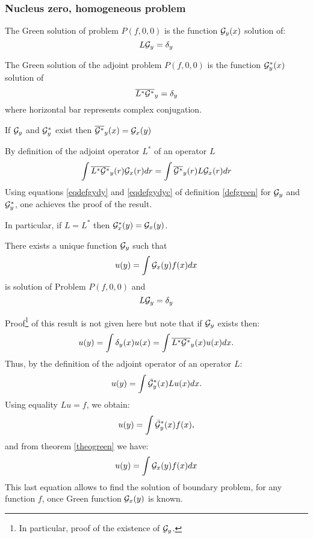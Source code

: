 \documentclass[12pt]{book}
\begin{document}
\subsubsection{Nucleus zero, homogeneous problem}
\begin{defn}\label{defgreen}
The Green solution of problem $P(f,0,0)$ is the
function 
${\cal G}_y(x)$ solution of: 
\begin{equation}\label{eqdefgydy}
L{\cal G}_y=\delta_y
\end{equation}

The Green solution of the adjoint problem $P(f,0,0)$ is the function
${\cal G}^*_y(x)$ solution of 
\begin{equation}\label{eqdefgydyc}
\overline{L^*{\cal G}^*}_y=\delta_y
\end{equation}
where horizontal bar represents complex conjugation.
\end{defn}
\begin{thm}\label{theogreen}
If ${\cal G}_y$ and ${\cal G}^*_y$ exist then
$\overline{{\cal G}^*}_y(x)= {\cal G}_x(y)$
\end{thm}
\begin{pf}
By definition of the adjoint operator $L^*$ of an operator $L$
\begin{equation}
\int \overline{L^*{\cal G^*}}_y(r){\cal G}_x(r)dr= \int \overline{{\cal
G^*}}_{y}(r)L{\cal G}_x(r) dr
\end{equation}
Using equations \ref{eqdefgydy} and \ref{eqdefgydyc} of definition
\ref{defgreen} 
for ${\cal G}_y$ and ${\cal G}^*_y$,
one achieves the proof of the result.
\end{pf}
In particular, if $L=L^*$ then ${\cal G}^*_x(y)= {\cal G}_x(y)$.

\begin{thm}
There exists a unique function ${\cal G}_y$ such that
\begin{equation}
u(y)=\int {\cal G}_x(y) f(x)dx
\end{equation}
is solution of Problem $P(f,0,0)$ and
\begin{equation}
L{\cal G}_y=\delta_y
\end{equation}
\end{thm}
Proof\footnote{In particular, proof of the existence of ${\cal G}_y$.} of
this result is not given here but note that if 
${\cal G}_y$ exists then:
\begin{equation}
u(y)=\int \delta_y(x)u(x)=\int \overline{L^*{\cal G}^*}_y(x) u(x)dx.
\end{equation}
Thus, by the definition of the adjoint operator of an operator $L$:
\begin{equation}
u(y)=\int \bar{\cal G}^*_y(x) Lu(x)dx.
\end{equation}
Using equality $Lu=f$, we obtain:
\begin{equation}
u(y)=\int \bar{\cal G}^*_y(x) f(x),
\end{equation}
and from theorem \ref{theogreen} we have:
\begin{equation}
u(y)=\int {\cal G}_x(y) f(x)dx
\end{equation}
This last equation allows to find the solution of boundary problem, for any
function $f$, once Green function ${\cal G}_x(y)$ is known.
\end{document}
